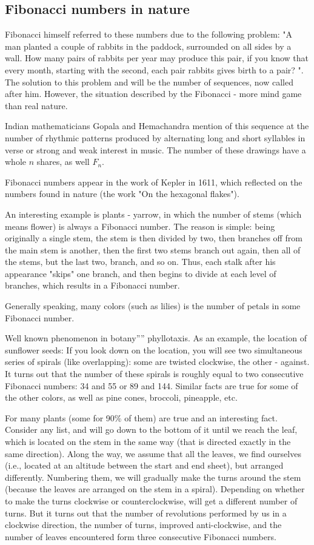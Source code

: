 \subsection{ Fibonacci numbers in nature }

Fibonacci himself referred to these numbers due to the following problem: "A man planted a couple of rabbits in the paddock, surrounded on all sides by a wall. How many pairs of rabbits per year may produce this pair, if you know that every month, starting with the second, each pair rabbits gives birth to a pair? ". The solution to this problem and will be the number of sequences, now called after him. However, the situation described by the Fibonacci - more mind game than real nature.

Indian mathematicians Gopala and Hemachandra mention of this sequence at the number of rhythmic patterns produced by alternating long and short syllables in verse or strong and weak interest in music. The number of these drawings have a whole $n$ shares, as well $F_n$.

Fibonacci numbers appear in the work of Kepler in 1611, which reflected on the numbers found in nature (the work "On the hexagonal flakes").

An interesting example is plants - yarrow, in which the number of stems (which means flower) is always a Fibonacci number. The reason is simple: being originally a single stem, the stem is then divided by two, then branches off from the main stem is another, then the first two stems branch out again, then all of the stems, but the last two, branch, and so on. Thus, each stalk after his appearance "skips" one branch, and then begins to divide at each level of branches, which results in a Fibonacci number.

Generally speaking, many colors (such as lilies) is the number of petals in some Fibonacci number.

Well known phenomenon in botany'''' phyllotaxis. As an example, the location of sunflower seeds: If you look down on the location, you will see two simultaneous series of spirals (like overlapping): some are twisted clockwise, the other - against. It turns out that the number of these spirals is roughly equal to two consecutive Fibonacci numbers: 34 and 55 or 89 and 144. Similar facts are true for some of the other colors, as well as pine cones, broccoli, pineapple, etc.

For many plants (some for 90\% of them) are true and an interesting fact. Consider any list, and will go down to the bottom of it until we reach the leaf, which is located on the stem in the same way (that is directed exactly in the same direction). Along the way, we assume that all the leaves, we find ourselves (i.e., located at an altitude between the start and end sheet), but arranged differently. Numbering them, we will gradually make the turns around the stem (because the leaves are arranged on the stem in a spiral). Depending on whether to make the turns clockwise or counterclockwise, will get a different number of turns. But it turns out that the number of revolutions performed by us in a clockwise direction, the number of turns, improved anti-clockwise, and the number of leaves encountered form three consecutive Fibonacci numbers.


